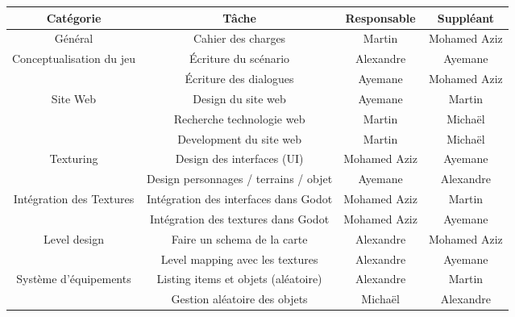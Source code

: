 \begin{figure}[H]
    \fontsize{10pt}{15pt}\selectfont
    \centering
    \begin{tabular}{|c|c|c|c|}
        \hline
        \bfseries{Cat\'egorie} & \bfseries{T\^ache} & \bfseries{Responsable} & \bfseries{Suppl\'eant} \\
        \hline\hline
            G\'en\'eral & Cahier des charges & Martin & Mohamed Aziz \\
        \hline\hline
            \multirow{2}{*}{Conceptualisation du jeu} & \'Ecriture du sc\'enario & Alexandre & Ayemane \\
            \cline{2-4}
            & \'Ecriture des dialogues & Ayemane  & Mohamed Aziz \\
        \hline\hline
            \multirow{3}{*}{Site Web} & Design du site web & Ayemane & Martin \\
            \cline{2-4}
            & Recherche technologie web & Martin & Michaël \\
            \cline{2-4}
            & Development du site web & Martin & Michaël \\
        \hline\hline
            \multirow{2}{*}{Texturing} & Design des interfaces (UI) & Mohamed Aziz & Ayemane \\
            \cline{2-4}
            & Design personnages / terrains / objet & Ayemane & Alexandre \\
        \hline\hline
            \multirow{2}{*}{Intégration des Textures} & Int\'egration des interfaces dans Godot & Mohamed Aziz & Martin \\
            \cline{2-4}
            & Int\'egration des textures dans Godot & Mohamed Aziz & Ayemane \\
            \hline\hline
            \multirow{2}{*}{Level design} & Faire un schema de la carte & Alexandre & Mohamed Aziz \\
            \cline{2-4}
            &Level mapping avec les textures & Alexandre & Ayemane \\
        \hline\hline
            \multirow{3}{*}{Système d'équipements} & Listing items et objets (al\'eatoire) & Alexandre & Martin \\
            \cline{2-4}
            & Gestion aléatoire des objets & Michaël & Alexandre \\

\end{tabular}
\end{figure}
